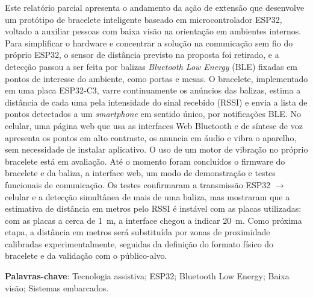 \setlength{\absparsep}{18pt}
\begin{resumo}
Este relatório parcial apresenta o andamento da ação de extensão que desenvolve um protótipo de bracelete inteligente baseado em microcontrolador ESP32, voltado a auxiliar pessoas com baixa visão na orientação em ambientes internos. Para simplificar o hardware e concentrar a solução na comunicação sem fio do próprio ESP32, o sensor de distância previsto na proposta foi retirado, e a detecção passou a ser feita por balizas \textit{Bluetooth Low Energy} (BLE) fixadas em pontos de interesse do ambiente, como portas e mesas. O bracelete, implementado em uma placa ESP32-C3, varre continuamente os anúncios das balizas, estima a distância de cada uma pela intensidade do sinal recebido (RSSI) e envia a lista de pontos detectados a um \textit{smartphone} em sentido único, por notificações BLE. No celular, uma página web que usa as interfaces Web Bluetooth e de síntese de voz apresenta os pontos em alto contraste, os anuncia em áudio e vibra o aparelho, sem necessidade de instalar aplicativo. O uso de um motor de vibração no próprio bracelete está em avaliação. Até o momento foram concluídos o firmware do bracelete e da baliza, a interface web, um modo de demonstração e testes funcionais de comunicação. Os testes confirmaram a transmissão ESP32 $\rightarrow$ celular e a detecção simultânea de mais de uma baliza, mas mostraram que a estimativa de distância em metros pelo RSSI é instável com as placas utilizadas: com as placas a cerca de 1~m, a interface chegou a indicar 20~m. Como próxima etapa, a distância em metros será substituída por zonas de proximidade calibradas experimentalmente, seguidas da definição do formato físico do bracelete e da validação com o público-alvo.

\textbf{Palavras-chave}: Tecnologia assistiva; ESP32; Bluetooth Low Energy; Baixa visão; Sistemas embarcados.
\end{resumo}

